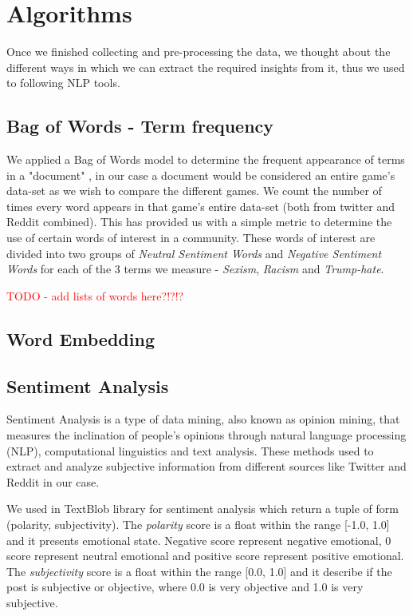 \section{Algorithms}
Once we finished collecting and pre-processing the data, we thought about the different ways in which we can extract the required insights from it, thus we used to following NLP tools.


\subsection{Bag of Words - Term frequency}
We applied a Bag of Words model to determine the frequent appearance of terms in a "document" , in our case a document would be considered an entire game's data-set as we wish to compare the different games. We count the number of times every word appears in that game's entire data-set (both from twitter and Reddit combined). This has provided us with a simple metric to determine the use of certain words of interest in a community. These words of interest are divided into two groups of \emph{Neutral Sentiment Words} and \emph{Negative Sentiment Words} for each of the 3 terms we measure - \emph{Sexism}, \emph{Racism} and \emph{Trump-hate}.


\textcolor{red}{TODO - add lists of words here?!?!?}

\subsection{Word Embedding}


\subsection{Sentiment Analysis}
Sentiment Analysis \cite{liu2012sentiment} is a type of data mining, also known as opinion mining, that measures the inclination of people’s opinions through natural language processing (NLP), computational linguistics and text analysis. These methods used to extract and analyze subjective information from different sources like Twitter and Reddit in our case. 


We used in TextBlob library for sentiment analysis which return a tuple of form (polarity, subjectivity). The \emph{polarity} score is a float within the range [-1.0, 1.0] and it presents emotional state. Negative score represent negative emotional, 0 score represent neutral emotional and positive score represent positive emotional. The \emph{subjectivity} score is a float within the range [0.0, 1.0] and it describe if the post is subjective or objective,  where 0.0 is very objective and 1.0 is very subjective.

